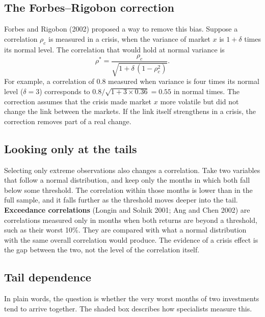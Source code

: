 \subsection{The Forbes--Rigobon correction}

Forbes and Rigobon (2002) proposed a way to remove this bias. Suppose a correlation $\rho_c$ is measured in a crisis, when the variance of market $x$ is $1 + \delta$ times its normal level. The correlation that would hold at normal variance is
\begin{equation}
  \rho^* = \frac{\rho_c}{\sqrt{1 + \delta\,(1 - \rho_c^2)}}.
  \label{eq:13-fr}
\end{equation}
For example, a correlation of 0.8 measured when variance is four times its normal level ($\delta = 3$) corresponds to $0.8/\sqrt{1 + 3 \times 0.36} = 0.55$ in normal times. The correction assumes that the crisis made market $x$ more volatile but did not change the link between the markets. If the link itself strengthens in a crisis, the correction removes part of a real change.

\subsection{Looking only at the tails}

Selecting only extreme observations also changes a correlation. Take two variables that follow a normal distribution, and keep only the months in which both fall below some threshold. The correlation within those months is lower than in the full sample, and it falls further as the threshold moves deeper into the tail. \textbf{Exceedance correlations} (Longin and Solnik 2001; Ang and Chen 2002) are correlations measured only in months when both returns are beyond a threshold, such as their worst 10\%. They are compared with what a normal distribution with the same overall correlation would produce. The evidence of a crisis effect is the gap between the two, not the level of the correlation itself.

\subsection{Tail dependence}

In plain words, the question is whether the very worst months of two investments tend to arrive together. The shaded box describes how specialists measure this.

